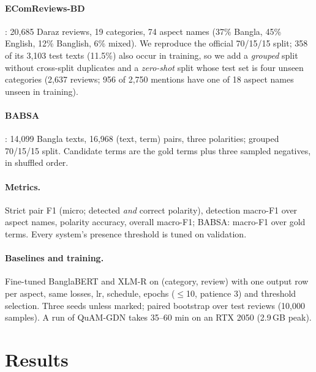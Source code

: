 \documentclass[11pt]{article}
\newcommand{\quam}{QuAM-GDN}
\begin{document}
\paragraph{EComReviews-BD} \citep{haque2026ecomreviews}: 20,685 Daraz reviews, 19 categories, 74 aspect
names (37\% Bangla, 45\% English, 12\% Banglish, 6\% mixed). We reproduce the official 70/15/15 split;
358 of its 3,103 test texts (11.5\%) also occur in training, so we add a \emph{grouped} split without
cross-split duplicates and a \emph{zero-shot} split whose test set is four unseen categories (2,637
reviews; 956 of 2,750 mentions have one of 18 aspect names unseen in training).
\paragraph{BABSA} \citep{rohman2025babsa}: 14,099 Bangla texts, 16,968 (text, term) pairs, three
polarities; grouped 70/15/15 split. Candidate terms are the gold terms plus three sampled negatives, in
shuffled order.
\paragraph{Metrics.} Strict pair F1 (micro; detected \emph{and} correct polarity), detection macro-F1
over aspect names, polarity accuracy, overall macro-F1; BABSA: macro-F1 over gold terms. Every system's
presence threshold is tuned on validation.
\paragraph{Baselines and training.} Fine-tuned BanglaBERT and XLM-R on (category, review) with one
output row per aspect, same losses, lr, schedule, epochs ($\leq$10, patience 3) and threshold selection.
Three seeds unless marked; paired bootstrap over test reviews (10,000 samples). A run of \quam{} takes
35--60 min on an RTX 2050 (2.9\,GB peak).

\section{Results}
\end{document}
